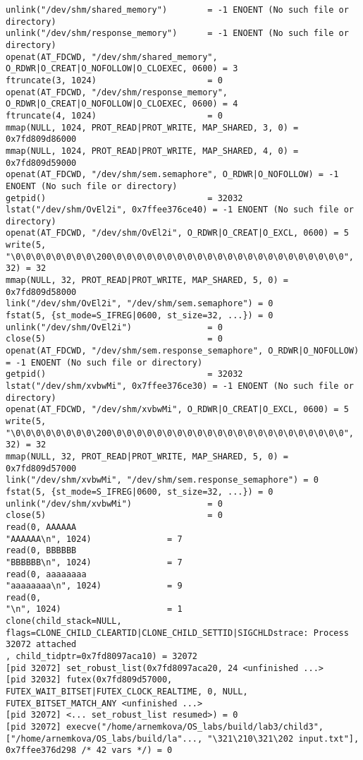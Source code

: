 \documentclass[a4paper, 14pt]{article}
\begin{document}
\begin{lstlisting}
unlink("/dev/shm/shared_memory")        = -1 ENOENT (No such file or directory)
unlink("/dev/shm/response_memory")      = -1 ENOENT (No such file or directory)
openat(AT_FDCWD, "/dev/shm/shared_memory", O_RDWR|O_CREAT|O_NOFOLLOW|O_CLOEXEC, 0600) = 3
ftruncate(3, 1024)                      = 0
openat(AT_FDCWD, "/dev/shm/response_memory", O_RDWR|O_CREAT|O_NOFOLLOW|O_CLOEXEC, 0600) = 4
ftruncate(4, 1024)                      = 0
mmap(NULL, 1024, PROT_READ|PROT_WRITE, MAP_SHARED, 3, 0) = 0x7fd809d86000
mmap(NULL, 1024, PROT_READ|PROT_WRITE, MAP_SHARED, 4, 0) = 0x7fd809d59000
openat(AT_FDCWD, "/dev/shm/sem.semaphore", O_RDWR|O_NOFOLLOW) = -1 ENOENT (No such file or directory)
getpid()                                = 32032
lstat("/dev/shm/OvEl2i", 0x7ffee376ce40) = -1 ENOENT (No such file or directory)
openat(AT_FDCWD, "/dev/shm/OvEl2i", O_RDWR|O_CREAT|O_EXCL, 0600) = 5
write(5, "\0\0\0\0\0\0\0\0\200\0\0\0\0\0\0\0\0\0\0\0\0\0\0\0\0\0\0\0\0\0\0\0", 32) = 32
mmap(NULL, 32, PROT_READ|PROT_WRITE, MAP_SHARED, 5, 0) = 0x7fd809d58000
link("/dev/shm/OvEl2i", "/dev/shm/sem.semaphore") = 0
fstat(5, {st_mode=S_IFREG|0600, st_size=32, ...}) = 0
unlink("/dev/shm/OvEl2i")               = 0
close(5)                                = 0
openat(AT_FDCWD, "/dev/shm/sem.response_semaphore", O_RDWR|O_NOFOLLOW) = -1 ENOENT (No such file or directory)
getpid()                                = 32032
lstat("/dev/shm/xvbwMi", 0x7ffee376ce30) = -1 ENOENT (No such file or directory)
openat(AT_FDCWD, "/dev/shm/xvbwMi", O_RDWR|O_CREAT|O_EXCL, 0600) = 5
write(5, "\0\0\0\0\0\0\0\0\200\0\0\0\0\0\0\0\0\0\0\0\0\0\0\0\0\0\0\0\0\0\0\0", 32) = 32
mmap(NULL, 32, PROT_READ|PROT_WRITE, MAP_SHARED, 5, 0) = 0x7fd809d57000
link("/dev/shm/xvbwMi", "/dev/shm/sem.response_semaphore") = 0
fstat(5, {st_mode=S_IFREG|0600, st_size=32, ...}) = 0
unlink("/dev/shm/xvbwMi")               = 0
close(5)                                = 0
read(0, AAAAAA
"AAAAAA\n", 1024)               = 7
read(0, BBBBBB
"BBBBBB\n", 1024)               = 7
read(0, aaaaaaaa
"aaaaaaaa\n", 1024)             = 9
read(0,
"\n", 1024)                     = 1
clone(child_stack=NULL, flags=CLONE_CHILD_CLEARTID|CLONE_CHILD_SETTID|SIGCHLDstrace: Process 32072 attached
, child_tidptr=0x7fd8097aca10) = 32072
[pid 32072] set_robust_list(0x7fd8097aca20, 24 <unfinished ...>
[pid 32032] futex(0x7fd809d57000, FUTEX_WAIT_BITSET|FUTEX_CLOCK_REALTIME, 0, NULL, FUTEX_BITSET_MATCH_ANY <unfinished ...>
[pid 32072] <... set_robust_list resumed>) = 0
[pid 32072] execve("/home/arnemkova/OS_labs/build/lab3/child3", ["/home/arnemkova/OS_labs/build/la"..., "\321\210\321\202 input.txt"], 0x7ffee376d298 /* 42 vars */) = 0

\end{lstlisting}
\end{document}
